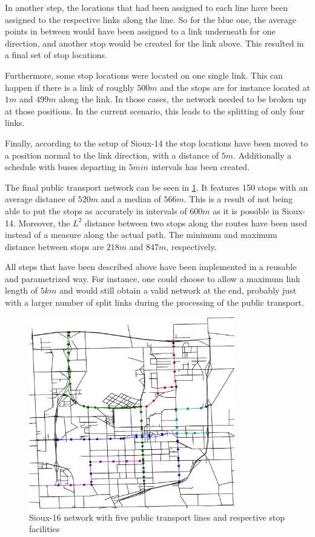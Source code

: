 In another step, the locations that had been assigned to each line have been
assigned to the respective links along the line. So for the blue one, the average
points in between would have been assigned to a link underneath for one direction,
and another stop would be created for the link above. This resulted in a final
set of stop locations.

Furthermore, some stop locations were located on one single link. This
can happen if there is a link of roughly $500m$ and the stops are for instance
located at $1m$ and $499m$ along the link. In those cases, the network needed to
be broken up at those positions. In the current scenario, this leads to the splitting
of only four links.

Finally, according to the setup of Sioux-14 the stop locations have been moved
to a position normal to the link direction, with a distance of $5m$. Additionally
a schedule with buses departing in $5min$ intervals has been created.

The final public transport network can be seen in \cref{fig:pt_network}. It features
150 stops with an average distance of $520m$ and a median of $566m$. This is a
result of not being able to put the stops as accurately in intervals of $600m$
as it is possible in Sioux-14. Moreover, the $L^2$ distance between two stops along
the routes have been used instead of a measure along the actual path. The minimum
and maximum distance between stops are $218m$ and $847m$, respectively.

All steps that have been described above have been implemented in a reusable and
parametrized way. For instance, one could choose to allow a maximum link length of
$5km$ and would still obtain a valid network at the end, probably just with a larger
number of split links during the processing of the public transport.

\begin{figure}[h]
    \centering
    \includegraphics[width=0.8\textwidth]{figures/pt_network_cropped.pdf}
    \caption{Sioux-16 network with five public transport lines and respective stop
    facilities}
    \label{fig:pt_network}
\end{figure}

